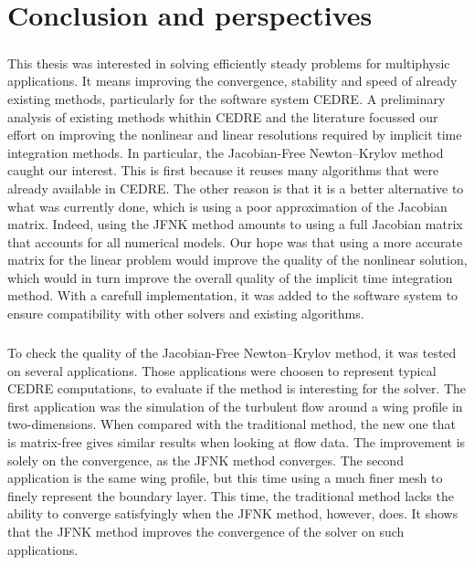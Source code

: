 \chapter*{Conclusion and perspectives}

  \paragraph{}
  This thesis was interested in solving efficiently steady problems for multiphysic applications.
  It means improving the convergence, stability and speed of already existing methods, particularly for the software system CEDRE.
  A preliminary analysis of existing methods whithin CEDRE and the literature focussed our effort on improving the nonlinear and linear resolutions required by implicit time integration methods.
  In particular, the Jacobian-Free Newton--Krylov method caught our interest.
  This is first because it reuses many algorithms that were already available in CEDRE.
  The other reason is that it is a better alternative to what was currently done, which is using a poor approximation of the Jacobian matrix.
  Indeed, using the JFNK method amounts to using a full Jacobian matrix that accounts for all numerical models.
  Our hope was that using a more accurate matrix for the linear problem would improve the quality of the nonlinear solution, which would in turn improve the overall quality of the implicit time integration method.
  With a carefull implementation, it was added to the software system to ensure compatibility with other solvers and existing algorithms.

  \paragraph{}
  To check the quality of the Jacobian-Free Newton--Krylov method, it was tested on several applications.
  Those applications were choosen to represent typical CEDRE computations, to evaluate if the method is interesting for the solver.
  The first application was the simulation of the turbulent flow around a wing profile in two-dimensions.
  When compared with the traditional method, the new one that is matrix-free gives similar results when looking at flow data.
  The improvement is solely on the convergence, as the JFNK method converges.
  The second application is the same wing profile, but this time using a much finer mesh to finely represent the boundary layer.
  This time, the traditional method lacks the ability to converge satisfyingly when the JFNK method, however, does.
  It shows that the JFNK method improves the convergence of the solver on such applications.

